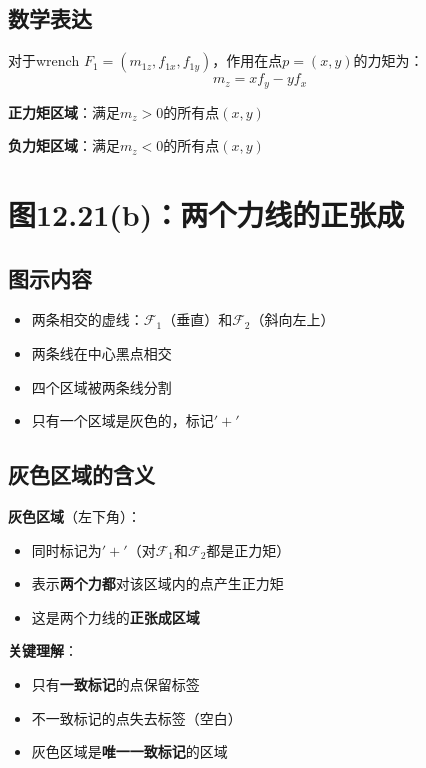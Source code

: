 \documentclass[12pt,a4paper]{article}
\begin{document}
\subsection{数学表达}

对于wrench $F_1 = (m_{1z}, f_{1x}, f_{1y})$，作用在点$p = (x, y)$的力矩为：
\begin{equation}
m_z = x f_y - y f_x
\end{equation}

\textbf{正力矩区域}：满足$m_z > 0$的所有点$(x, y)$

\textbf{负力矩区域}：满足$m_z < 0$的所有点$(x, y)$

\section{图12.21(b)：两个力线的正张成}

\subsection{图示内容}

\begin{itemize}
\item 两条相交的虚线：$\mathcal{F}_1$（垂直）和$\mathcal{F}_2$（斜向左上）
\item 两条线在中心黑点相交
\item 四个区域被两条线分割
\item 只有一个区域是灰色的，标记$'+'$
\end{itemize}

\subsection{灰色区域的含义}

\textbf{灰色区域}（左下角）：
\begin{itemize}
\item 同时标记为$'+'$（对$\mathcal{F}_1$和$\mathcal{F}_2$都是正力矩）
\item 表示\textbf{两个力都}对该区域内的点产生正力矩
\item 这是两个力线的\textbf{正张成区域}
\end{itemize}

\textbf{关键理解}：
\begin{itemize}
\item 只有\textbf{一致标记}的点保留标签
\item 不一致标记的点失去标签（空白）
\item 灰色区域是\textbf{唯一一致标记}的区域
\end{itemize}
\end{document}
